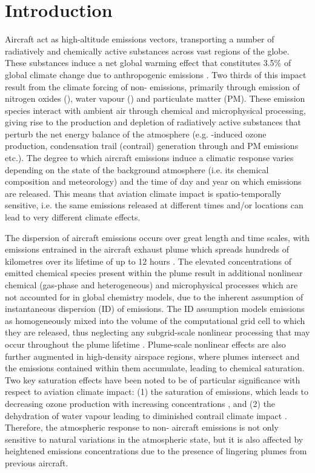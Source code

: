 \section{Introduction}
Aircraft act as high-altitude emissions vectors, transporting a number of radiatively and chemically active substances across vast regions of the globe. These substances induce a net global warming effect that constitutes 3.5\% of global climate change due to anthropogenic emissions \cite{Lee2021}. Two thirds of this impact result from the climate forcing of non- emissions, primarily through emission of nitrogen oxides (), water vapour () and particulate matter (PM). These emission species interact with ambient air through chemical and microphysical processing, giving rise to the production and depletion of radiatively active substances that perturb the net energy balance of the atmosphere (e.g. -induced ozone production, condensation trail (contrail) generation through  and PM emissions etc.). The degree to which aircraft emissions induce a climatic response varies depending on the state of the background atmosphere (i.e. its chemical composition and meteorology) and the time of day and year on which emissions are released. This means that aviation climate impact is spatio-temporally sensitive, i.e. the same emissions released at different times and/or locations can lead to very different climate effects. 

The dispersion of aircraft emissions occurs over great length and time scales, with emissions entrained in the aircraft exhaust plume which spreads hundreds of kilometres \cite{Kraabol2000a} over its lifetime of up to 12 hours \cite{EPA1992}. The elevated concentrations of emitted chemical species present within the plume result in additional nonlinear chemical (gas-phase and heterogeneous) and microphysical processes which are not accounted for in global chemistry models, due to the inherent assumption of instantaneous dispersion (ID) of emissions. The ID assumption models emissions as homogeneously mixed into the volume of the computational grid cell to which they are released, thus neglecting any subgrid-scale nonlinear processing that may occur throughout the plume lifetime \cite{Paoli2011}. Plume-scale nonlinear effects are also further augmented in high-density airspace regions, where plumes intersect and the emissions contained within them accumulate, leading to chemical saturation. Two key saturation effects have been noted to be of particular significance with respect to aviation climate impact: (1) the saturation of  emissions, which leads to decreasing ozone production with increasing  concentrations \cite{Jaegle1999}, and (2) the dehydration of water vapour leading to diminished contrail climate impact \cite{Schumann2015}. Therefore, the atmospheric response to non- aircraft emissions is not only sensitive to natural variations in the atmospheric state, but it is also affected by heightened emissions concentrations due to the presence of lingering plumes from previous aircraft.

